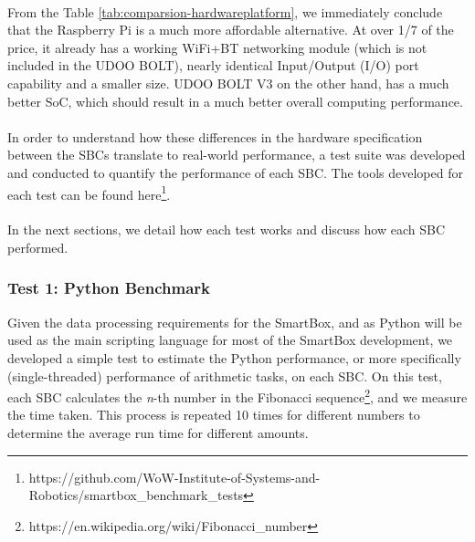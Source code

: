 \paragraph{} From the Table \ref{tab:comparsion-hardwareplatform}, we immediately conclude that the Raspberry Pi is a much more affordable alternative. At over 1/7 of the price, it already has a working WiFi+BT networking module (which is not included in the UDOO BOLT), nearly identical Input/Output (I/O) port capability and a smaller size. UDOO BOLT V3 on the other hand, has a much better SoC, which should result in a much better overall computing performance.


\paragraph{} In order to understand how these differences in the hardware specification between the \acs{SBC}s translate to real-world performance, a test suite was developed and conducted to quantify the performance of each \acs{SBC}. The tools developed for each test can be found here\footnote{https://github.com/WoW-Institute-of-Systems-and-Robotics/smartbox\_benchmark\_tests}. 

\paragraph{}In the next sections, we detail how each test works and discuss how each \acs{SBC} performed. 

\subsubsection{Test 1: Python Benchmark}

Given the data processing requirements for the SmartBox, and as Python will be used as the main scripting language for most of the SmartBox development, we developed a simple test to estimate the Python performance, or more specifically (single-threaded) performance of arithmetic tasks, on each \acs{SBC}. On this test, each \acs{SBC} calculates the \textit{n}-th number in the Fibonacci sequence\footnote{https://en.wikipedia.org/wiki/Fibonacci\_number}, and we measure the time taken. This process is repeated 10 times for different numbers to determine the average run time for different amounts.

